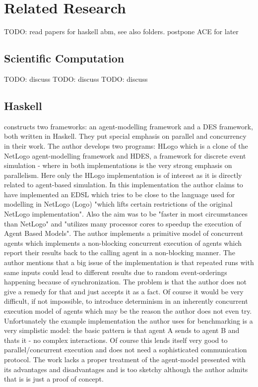 \section{Related Research}
TODO: read papers for haskell abm, see also folders. postpone ACE for later

\subsection{Scientific Computation}
TODO: discuss \cite{Kaminski2013}
TODO: discuss \cite{Ionescu2013}
TODO: discuss \cite{Botta20114025}

\subsection{Haskell}
\cite{Bezirgiannis2013} constructs two frameworks: an agent-modelling framework and a DES framework, both written in Haskell. They put special emphasis on parallel and concurrency in their work. The author develops two programs: HLogo which is a clone of the NetLogo agent-modelling framework and HDES, a framework for discrete event simulation - where in both implementations is the very strong emphasis on parallelism.  Here only the HLogo implementation is of interest as it is directly related to agent-based simulation. In this implementation the author claims to have implemented an EDSL which tries to be close to the language used for modelling in NetLogo (Logo) "which lifts certain restrictions of the original NetLogo implementation". Also the aim was to be "faster in most circumstances than NetLogo" and "utilizes many processor cores to speedup the execution of Agent Based Models". The author implements a primitive model of concurrent agents which implements a non-blocking concurrent execution of agents which report their results back to the calling agent in a non-blocking manner. The author mentions that a big issue of the implementation is that repeated runs with same inputs could lead to different results due to random event-orderings happening because of synchronization. The problem is that the author does not give a remedy for that and just accepts it as a fact. Of course it would be very difficult, if not impossible, to introduce determinism in an inherently concurrent execution model of agents which may be the reason the author does not even try. Unfortunately the example implementation the author uses for benchmarking is a very simplistic model: the basic pattern is that agent A sends to agent B and thats it - no complex interactions. Of course this lends itself very good to parallel/concurrent execution and does not need a sophisticated communication protocol. The work lacks a proper treatment of the agent-model presented with its advantages and disadvantages and is too sketchy although the author admits that is is just a proof of concept. \\

